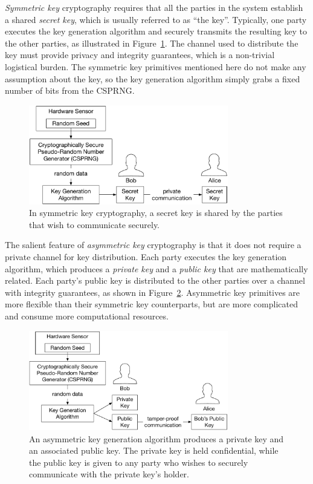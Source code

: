 \textit{Symmetric key} cryptography requires that all the parties in the system
establish a shared \textit{secret key}, which is usually referred to as ``the
key''. Typically, one party executes the key generation algorithm and securely
transmits the resulting key to the other parties, as illustrated in
Figure~\ref{fig:symmetric_key_generation}. The channel used to
distribute the key must provide privacy and integrity guarantees, which is a
non-trivial logistical burden. The symmetric key primitives mentioned here do
not make any assumption about the key, so the key generation algorithm simply
grabs a fixed number of bits from the CSPRNG.

\begin{figure}[hbt]
  \centering
  \includegraphics[width=87mm]{figures/symmetric_key_generation.pdf}
  \caption{
    In symmetric key cryptography, a secret key is shared by the parties that
    wish to communicate securely.
  }
  \label{fig:symmetric_key_generation}
\end{figure}

The salient feature of \textit{asymmetric key} cryptography is that it does not
require a private channel for key distribution. Each party executes the key
generation algorithm, which produces a \textit{private key} and a
\textit{public key} that are mathematically related. Each party's public key
is distributed to the other parties over a channel with integrity guarantees,
as shown in Figure~\ref{fig:asymmetric_key_generation}.
Asymmetric key primitives are more flexible than their symmetric key
counterparts, but are more complicated and consume more computational
resources.

\begin{figure}[hbt]
  \centering
  \includegraphics[width=87mm]{figures/asymmetric_key_generation.pdf}
  \caption{
    An asymmetric key generation algorithm produces a private key and an
    associated public key. The private key is held confidential, while the
    public key is given to any party who wishes to securely communicate with
    the private key's holder.
  }
  \label{fig:asymmetric_key_generation}
\end{figure}


